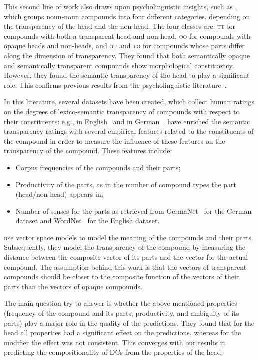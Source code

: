 \documentclass[output=paper]{langsci/langscibook}
\begin{document}
This  second line of work also draws upon psycholinguistic insights,  such as \citet{Libben:1997,Libben:2003}, which groups noun-noun compounds into four different categories, depending on the transparency of the head and the non-head.
The four classes are:
 {\textsc{tt}} for compounds with both a transparent head and non-head,
 {\textsc{oo}} for compounds with opaque heads and non-heads,
and  {\textsc{ot}} and  {\textsc{to}} for compounds whose parts differ along the dimension of transparency. They found that both semantically opaque and semantically transparent compounds show morphological constituency. However, they found the semantic transparency of the head to play a significant role. This confirms previous results from the psycholinguistic literature~\citep{Zwitserlood:1994}. 

 {In this literature, several datasets have been created, which collect human ratings on the degrees of lexico-semantic transparency of compounds with respect to their constituents: e.g., in English~\citep{Reddy:2011,Juhaszetal:2015} and in German~\citep{SchulteImWaldeEtAl:16a}.} 
\citet{SchulteImWaldeEtAl:16a} have enriched the semantic transparency ratings with several empirical features related to the  {constituents} of the compound in order to measure the influence of these features on the  {transparency} of the compound. These features include:
\begin{itemize}
\item Corpus frequencies of the compounds and their parts;
\item Productivity of the parts, as in the number of compound types the part (head/non-head) appears in;
\item Number of senses for the parts as retrieved from GermaNet~\citep{hamp:97,heinrich:10} for the German dataset and WordNet~\citep{fellbaum:98} for the English dataset.
\end{itemize}

\cite{SchulteImWaldeEtAl:16} use vector space models to model the meaning of the compounds and their parts. Subsequently, they model the  {transparency} of the compound by measuring the distance between the composite vector of its parts and the vector for the actual compound. The assumption behind this work is that the vectors of  {transparent} compounds should be closer to the composite function of the vectors of their parts than the vectors of  {opaque} compounds. 

The main question \cite{SchulteImWaldeEtAl:16} try to answer  
is whether the above-mentioned properties (frequency of the compound and its parts, productivity, and ambiguity of its parts) play a major role in the  quality of the predictions. They found that for the head all properties had a significant effect on the predictions, whereas for the modifier the effect was not consistent. This converges with our results in predicting the compositionality of DCs from the properties of the head.
\end{document}
